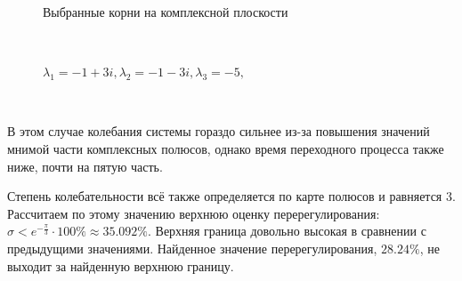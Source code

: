 \documentclass[a4paper]{article}
\begin{document}
\begin{figure}[H]
\begin{minipage}{0.5\textwidth}
        \caption{$\lambda_1=-1+3i, \lambda_2=-1-3i, \lambda_3=-5,$}
        \centerline{Выбранные корни на комплексной плоскости}
    \end{minipage}\\[1em]
\end{figure}\noindent\

В этом случае колебания системы гораздо сильнее из-за повышения значений мнимой части комплексных полюсов, однако время переходного процесса также ниже, почти на пятую часть.\

Степень колебательности всё также определяется по карте полюсов и равняется $3$. Рассчитаем по этому значению верхнюю оценку перерегулирования: $\sigma < e^{-\frac{\pi}{3}}\cdot 100\% \approx 35.092\%$. Верхняя граница довольно высокая в сравнении с предыдущими значениями. Найденное значение перерегулирования, $28.24\%$, не выходит за найденную верхнюю границу. 
\end{document}
